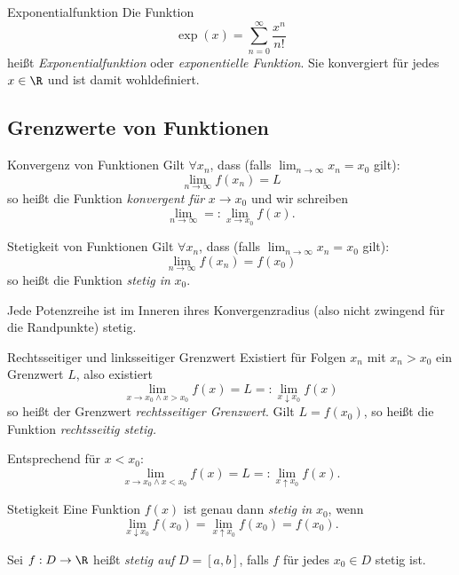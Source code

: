 \documentclass[german]{../spicker}
\begin{document}
\begin{defi}{Exponentialfunktion}
    Die Funktion
    $$
        \exp(x) = \sum^\infty_{n=0} \frac{x^n}{n!}
    $$
    heißt \emph{Exponentialfunktion} oder \emph{exponentielle Funktion}.
    Sie konvergiert für jedes $x\in \R$ und ist damit wohldefiniert.
\end{defi}

\subsection{Grenzwerte von Funktionen}

\begin{defi}{Konvergenz von Funktionen}
    Gilt $\forall x_n$, dass (falls $\lim_{n\to\infty} x_n=x_0$ gilt):
    $$
        \lim_{n\to\infty} f(x_n) = L
    $$
    so heißt die Funktion \emph{konvergent für} $x \to x_0$ und wir schreiben
    $$
        \lim_{n\to\infty} =: \lim_{x\to x_0} f(x).
    $$
\end{defi}

\begin{defi}{Stetigkeit von Funktionen}
    Gilt $\forall x_n$, dass (falls $\lim_{n\to\infty} x_n=x_0$ gilt):
    $$
        \lim_{n\to\infty} f(x_n) = f(x_0)
    $$
    so heißt die Funktion \emph{stetig in} $x_0$.

    Jede Potenzreihe ist im Inneren ihres Konvergenzradius (also nicht zwingend für die Randpunkte) stetig.
\end{defi}

\begin{defi}{Rechtsseitiger und linksseitiger Grenzwert}
    Existiert für Folgen $x_n$ mit $x_n > x_0$ ein Grenzwert $L$, also existiert
    $$
        \lim_{x \to x_0 \land x > x_0} f(x) = L =:  \lim_{x \downarrow x_0} f(x)
    $$
    so heißt der Grenzwert \emph{rechtsseitiger Grenzwert}.
    Gilt $L=f(x_0)$, so heißt die Funktion \emph{rechtsseitig stetig.}

    Entsprechend für $x < x_0$:
    $$
        \lim_{x \to x_0 \land x < x_0} f(x) = L =:  \lim_{x \uparrow x_0} f(x).
    $$
\end{defi}

\begin{defi}{Stetigkeit}
    Eine Funktion $f(x)$ ist genau dann \emph{stetig in} $x_0$, wenn
    $$
        \lim_{x \downarrow x_0} f(x_0) = \lim_{x \uparrow  x_0} f(x_0) = f(x_0).
    $$

    Sei $f : D \to \R$ heißt \emph{stetig auf} $D = [a, b]$, falls $f$ für jedes $x_0 \in D$ stetig ist.
\end{defi}
\end{document}
